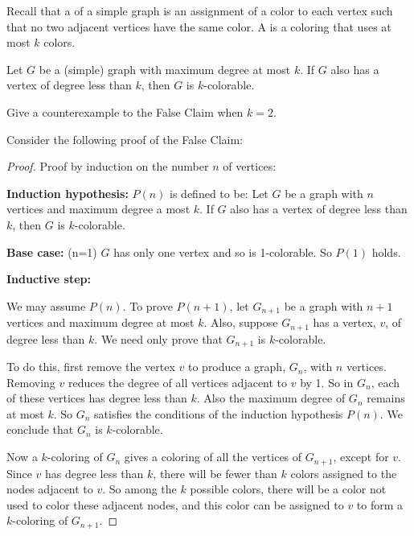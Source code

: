 \documentclass[12pt,twoside]{article}
\begin{document}
\begin{problem}{15}
Recall that a  of a simple graph is an assignment of a color
to each vertex such that no two adjacent vertices have the same color.  A
 is a coloring that uses at most $k$ colors.

\begin{falseclm*}
Let $G$ be a (simple) graph with maximum degree at most $k$.  If $G$ also
has a vertex of degree less than $k$, then $G$ is $k$-colorable.
\end{falseclm*}

\bparts {}\label{counterexample} Give a counterexample to the False
Claim when $k=2$. 


 Consider the following proof of the False Claim:

\begin{proof}

Proof by induction on the number $n$ of vertices:

{\bf Induction hypothesis:}
$P(n)$ is defined to be:  Let $G$ be a graph with $n$ vertices and maximum degree a most $k$.  If $G$ also has a vertex of degree less than $k$, then $G$ is $k$-colorable.

{\bf Base case:} (n=1) $G$ has only one vertex and so is 1-colorable.  So
$P(1)$ holds.

{\bf Inductive step:}

We may assume $P(n)$.  To prove $P(n+1)$, let $G_{n+1}$ be a graph with
$n+1$ vertices and maximum degree at most $k$.  Also, suppose $G_{n+1}$
has a vertex, $v$, of degree less than $k$.  We need only prove that
$G_{n+1}$ is $k$-colorable.

To do this, first remove the vertex $v$ to produce a graph, $G_n$, with
$n$ vertices.  Removing $v$ reduces the degree of all vertices adjacent to
$v$ by 1.  So in $G_n$, each of these vertices has degree less than $k$.
Also the maximum degree of $G_n$ remains at most $k$.  So $G_n$ satisfies
the conditions of the induction hypothesis $P(n)$.  We conclude that $G_n$
is $k$-colorable.

Now a $k$-coloring of $G_n$ gives a coloring of all the vertices of
$G_{n+1}$, except for $v$.  Since $v$ has degree less than $k$, there will
be fewer than $k$ colors assigned to the nodes adjacent to $v$.  So among
the $k$ possible colors, there will be a color not used to color these
adjacent nodes, and this color can be assigned to $v$ to form a
$k$-coloring of $G_{n+1}$.
\end{proof}


\end{problem}
\end{document}
